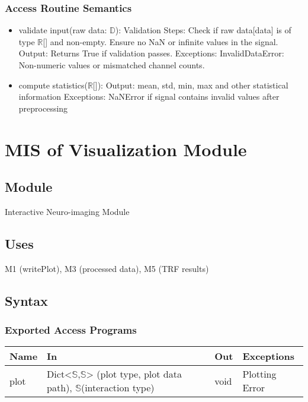 \documentclass[12pt, titlepage]{article}
\begin{document}
\subsubsection{Access Routine Semantics}
\begin{itemize}
  \item validate input(raw data: $\mathbb{D}$):
    \subitem Validation Steps:
        \subsubitem Check if raw data[data] is of type $\mathbb{R}$[] and non-empty.
        \subsubitem Ensure no NaN or infinite values in the signal.
    \subitem Output:
        \subsubitem Returns True if validation passes.
    \subitem Exceptions:
        \subsubitem InvalidDataError: Non-numeric values or mismatched channel counts.
    \item compute statistics($\mathbb{R}$[]):
    \subitem Output:
        \subsubitem mean, std, min, max and other statistical information
    \subitem Exceptions:
        \subsubitem NaNError if signal contains invalid values after preprocessing
\end{itemize}


\section{MIS of Visualization Module}

\subsection{Module}

Interactive Neuro-imaging Module
\subsection{Uses}

M1 (writePlot), M3 (processed data), M5 (TRF results)


\subsection{Syntax}


\subsubsection{Exported Access Programs}

\begin{center}
\begin{tabular}{p{2cm} p{4cm} p{4cm} p{2cm}}
\hline
\textbf{Name} & \textbf{In} & \textbf{Out} & \textbf{Exceptions} \\
\hline
plot & Dict<$\mathbb{S}$,$\mathbb{S}$> (plot type, plot data path), $\mathbb{S}$(interaction type) & void & Plotting Error \\

\hline
\end{tabular}
\end{center}
\end{document}

